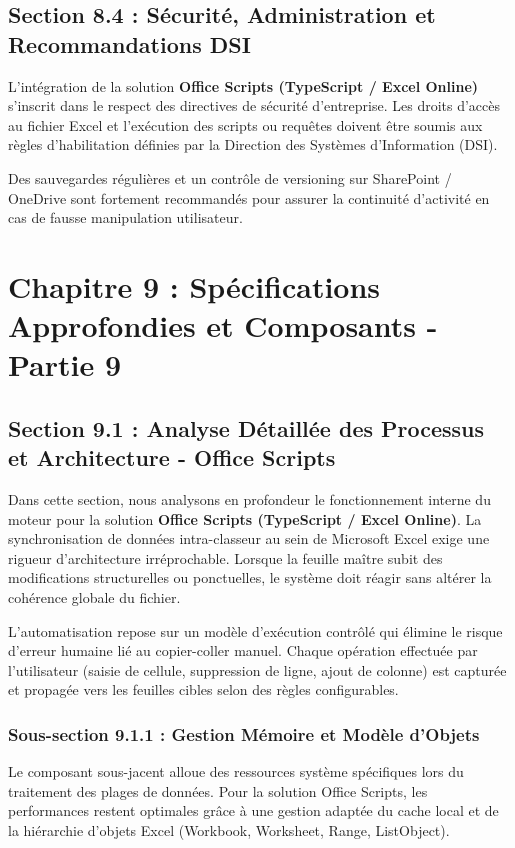 \documentclass[12pt,a4paper]{report}
\begin{document}
\section{Section 8.4 : Sécurité, Administration et Recommandations DSI}
L'intégration de la solution \textbf{Office Scripts (TypeScript / Excel Online)} s'inscrit dans le respect des directives de sécurité d'entreprise. Les droits d'accès au fichier Excel et l'exécution des scripts ou requêtes doivent être soumis aux règles d'habilitation définies par la Direction des Systèmes d'Information (DSI).

Des sauvegardes régulières et un contrôle de versioning sur SharePoint / OneDrive sont fortement recommandés pour assurer la continuité d'activité en cas de fausse manipulation utilisateur.


\chapter{Chapitre 9 : Spécifications Approfondies et Composants - Partie 9}

\section{Section 9.1 : Analyse Détaillée des Processus et Architecture - Office Scripts}
Dans cette section, nous analysons en profondeur le fonctionnement interne du moteur pour la solution \textbf{Office Scripts (TypeScript / Excel Online)}. La synchronisation de données intra-classeur au sein de Microsoft Excel exige une rigueur d'architecture irréprochable. Lorsque la feuille maître subit des modifications structurelles ou ponctuelles, le système doit réagir sans altérer la cohérence globale du fichier.

L'automatisation repose sur un modèle d'exécution contrôlé qui élimine le risque d'erreur humaine lié au copier-coller manuel. Chaque opération effectuée par l'utilisateur (saisie de cellule, suppression de ligne, ajout de colonne) est capturée et propagée vers les feuilles cibles selon des règles configurables.


\subsection{Sous-section 9.1.1 : Gestion Mémoire et Modèle d'Objets}
Le composant sous-jacent alloue des ressources système spécifiques lors du traitement des plages de données. Pour la solution Office Scripts, les performances restent optimales grâce à une gestion adaptée du cache local et de la hiérarchie d'objets Excel (Workbook, Worksheet, Range, ListObject).
\end{document}
